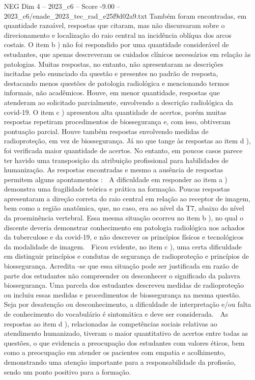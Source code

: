 \begin{textsample}{NEG Dim 4 – 2023\_c6 – Score -9.00 – 2023\_c6/enade\_2023\_tec\_rad\_e25f9d02a9.txt}
Também foram encontradas, em quantidade razoável, respostas que citaram, mas não discursaram sobre o direcionamento e localização do raio central na incidência oblíqua dos arcos costais.
O item b ) não foi respondido por uma quantidade considerável de estudantes, que apenas descreveram os cuidados clínicos necessários em relação às patologias.
Muitas respostas, no entanto, não apresentaram as descrições incitadas pelo enunciado da questão e presentes no padrão de resposta, destacando menos questões de patologia radiológica e mencionando termos informais, não acadêmicos.
Houve, em menor quantidade, respostas que atenderam ao solicitado parcialmente, envolvendo a descrição radiológica da covid-19.
O item c ) apresentou alta quantidade de acertos, porém muitas respostas repetiram procedimentos de biossegurança e, com isso, obtiveram pontuação parcial.
Houve também respostas envolvendo medidas de radioproteção, em vez de biossegurança.
Já no que tange às respostas ao item d ), foi verificada maior quantidade de acertos.
No entanto, em poucos casos parece ter havido uma transposição da atribuição profissional para habilidades de humanização.
As respostas encontradas e mesmo a ausência de respostas permitem alguns apontamentos :  A dificuldade em responder ao item a ) demonstra uma fragilidade teórica e prática na formação.
Poucas respostas apresentaram a direção correta do raio central em relação ao receptor de imagem, bem como a região anatômica, que, no caso, era ao nível da T7, abaixo do nível da proeminência vertebral.
Essa mesma situação ocorreu no item b ), no qual o discente deveria demonstrar conhecimento em patologia radiológica nos achados da tuberculose e da covid-19, e não descrever os princípios físicos e tecnológicos da modalidade de imagem.  Ficou evidente, no item c ), uma certa dificuldade em distinguir princípios e condutas de segurança de radioproteção e princípios de biossegurança.
Acredita -se que essa situação pode ser justificada em razão de parte dos estudantes não compreender ou desconhecer o significado da palavra biossegurança.
Uma parcela dos estudantes descreveu medidas de radioproteção ou incluiu essas medidas e procedimentos de biossegurança na mesma questão.
Seja por desatenção ou desconhecimento, a dificuldade de interpretação e/ou falta de conhecimento do vocabulário é sintomática e deve ser considerada.  As respostas ao item d ), relacionadas às competências sociais relativas ao atendimento humanizado, tiveram o maior quantitativo de acertos entre todas as questões, o que evidencia a preocupação dos estudantes com valores éticos, bem como a preocupação em atender os pacientes com empatia e acolhimento, demonstrando uma atenção importante para a responsabilidade da profissão, sendo um ponto positivo para a formação.

\end{textsample}
